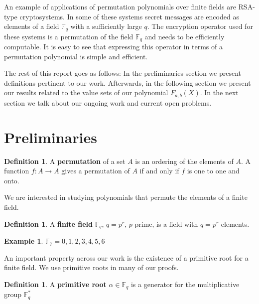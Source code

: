 \documentclass{article}
\theoremstyle{definition}
\newtheorem{definition}[theorem]{Definition}
\newtheorem{example}[theorem]{Example}
\theoremstyle{remark}
\numberwithin{equation}{section}
\begin{document}
An example of applications of permutation polynomials over finite fields are RSA-type cryptosystems. In some of these systems secret messages are encoded as elements of a field $\mathbb{F}_{q}$ with a sufficiently large $q$. The encryption operator used for these systems is a permutation of the field $\mathbb{F}_{q}$ and needs to be efficiently computable. It is easy to see that expressing this operator in terms of a permutation polynomial is simple and efficient.

The rest of this report goes as follows: In the preliminaries section we present definitions pertinent to our work. Afterwards, in the following section we present our results related to the value sets of our polynomial $F_{a,b}(X)$. In the next section we talk about our ongoing work and current open problems.

\section{Preliminaries}



\begin{definition}
  A \textbf{permutation} of a set $A$ is an ordering of the elements of $A$. A function $f: A \rightarrow A$ gives a permutation of $A$ if and only if $f$ is one to one and onto.
\end{definition}

We are interested in studying polynomials that permute the elements of a finite field.

\begin{definition}
  A \textbf{finite field} $\mathbb{F}_{q}$, $q=p^r$, $p$ prime, is a field with $q=p^r$ elements.
\end{definition}

\begin{example}
    $\mathbb{F}_7 = {0,1,2,3,4,5,6}$
  \end{example}

An important property across our work is the existence of a primitive root for a finite field. We use primitive roots in many of our proofs.

\begin{definition}
  A \textbf{primitive root} $\alpha \in \mathbb{F}_q$ is a generator for the multiplicative group $\mathbb{F}_{q}^{*}$
\end{definition}
\end{document}
